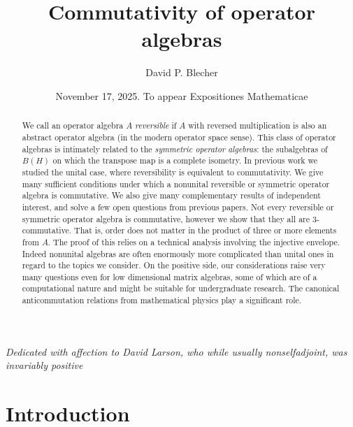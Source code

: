 \documentclass{amsart}
\title{Commutativity of operator algebras}
\author{David P. Blecher}
\date{November 17, 2025.  To appear Expositiones Mathematicae}
\theoremstyle{remark}
\theoremstyle{definition}
\numberwithin{equation}{section}
\begin{document}
 


\begin{abstract} 
We call an operator algebra $A$ {\em reversible} if $A$ with reversed multiplication  is also an abstract operator algebra (in the modern operator space sense).
This class of operator algebras is intimately related  to  the {\em symmetric operator algebras}:
the subalgebras of $B(H)$ on which the transpose map is a  complete isometry.  In previous work we 
studied the unital case, where reversibility is equivalent to commutativity.  We give many sufficient conditions
under which a nonunital reversible or symmetric  operator algebra is commutative.
We also give many complementary results of independent interest, and solve a few open questions from previous papers.
Not every reversible or symmetric operator algebra is commutative, however we show that they all are 3-commutative.  That is, order does not matter in  the product of three or more  elements from $A$.  The proof of this relies on a  technical analysis involving the injective envelope.  Indeed nonunital algebras are often enormously more complicated than unital ones 
in regard to the topics we consider. On the positive side,  our considerations raise 
very many questions even for low dimensional matrix algebras, some of which are of a computational nature and might be suitable for undergraduate research.  The canonical anticommutation relations from mathematical physics play a significant role.
  \end{abstract}
  

\maketitle

\begin{center} {\em Dedicated with affection to David Larson, who while usually nonselfadjoint, was invariably positive} \end{center} 



\section{Introduction} 
\end{document}
